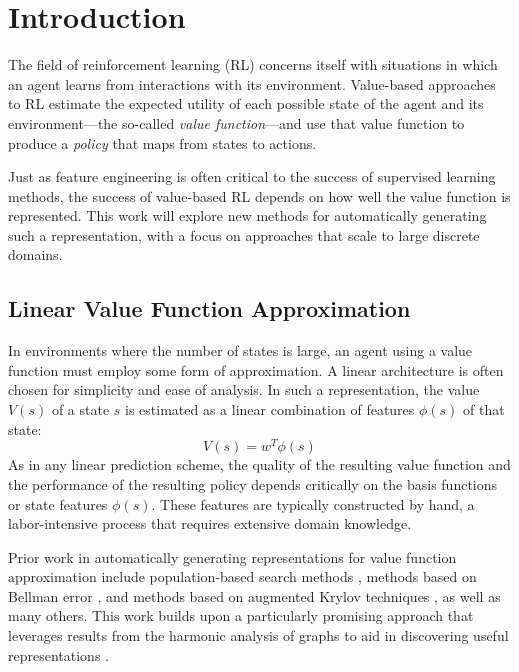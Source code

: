 \section{Introduction}

The field of reinforcement learning (RL) concerns itself with situations in
which an agent learns from interactions with its environment. Value-based
approaches to RL estimate the expected utility of each possible state of the
agent and its environment---the so-called \emph{value function}---and use that
value function to produce a \emph{policy} that maps from states to actions.

Just as feature engineering is often critical to the success of supervised
learning methods, the success of value-based RL depends on how well the value
function is represented. This work will explore new methods for automatically
generating such a representation, with a focus on approaches that scale to
large discrete domains.

\subsection{Linear Value Function Approximation}

In environments where the number of states is large, an agent using a value
function must employ some form of approximation. A linear architecture is often
chosen for simplicity and ease of analysis. In such a representation, the value
$V(s)$ of a state $s$ is estimated as a linear combination of features
$\phi(s)$ of that state:
%
\begin{equation}
V(s) = w^{T}\phi(s)
\end{equation}
%
As in any linear prediction scheme, the quality of the resulting value function
and the performance of the resulting policy depends critically on the basis
functions or state features $\phi(s)$. These features are typically constructed
by hand, a labor-intensive process that requires extensive domain knowledge.

Prior work in automatically generating representations for value function
approximation include population-based search methods
\citep{whiteson2006evolutionary}, methods based on Bellman error
\citep{parr2007analyzing}, and methods based on augmented Krylov techniques
\citep{petrik2007analysis}, as well as many others. This work builds upon a
particularly promising approach that leverages results from the harmonic
analysis of graphs to aid in discovering useful representations
\citep{Mahadevan2006Value,Coifman06Diffusion,Wang2009Multiscale}.

